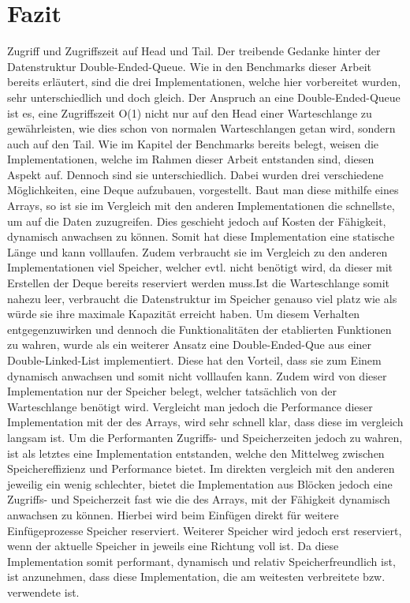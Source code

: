 \documentclass{TUBAFarbeiten}
\begin{document}
\section{Fazit}
Zugriff und Zugriffszeit auf Head und Tail. Der treibende Gedanke hinter der Datenstruktur Double-Ended-Queue. Wie in den Benchmarks dieser Arbeit bereits erläutert, sind die drei Implementationen, welche hier vorbereitet wurden, sehr unterschiedlich und doch gleich. Der Anspruch an eine Double-Ended-Queue ist es, eine Zugriffszeit O(1) nicht nur auf den Head einer Warteschlange zu gewährleisten, wie dies schon von normalen Warteschlangen getan wird, sondern auch auf den Tail. Wie im Kapitel der Benchmarks bereits belegt, weisen die Implementationen, welche im Rahmen dieser Arbeit entstanden sind, diesen Aspekt auf. Dennoch sind sie unterschiedlich. Dabei wurden drei verschiedene Möglichkeiten, eine Deque aufzubauen, vorgestellt. Baut man diese mithilfe eines Arrays, so ist sie im Vergleich mit den anderen Implementationen die schnellste, um auf die Daten zuzugreifen. Dies geschieht jedoch auf Kosten der Fähigkeit, dynamisch anwachsen zu können. Somit hat diese Implementation eine statische Länge und kann volllaufen. Zudem verbraucht sie im Vergleich zu den anderen Implementationen viel Speicher, welcher evtl. nicht benötigt wird, da dieser mit Erstellen der Deque bereits reserviert werden muss.Ist die Warteschlange somit nahezu leer, verbraucht die Datenstruktur im Speicher genauso viel platz wie als würde sie ihre maximale Kapazität erreicht haben. Um diesem Verhalten entgegenzuwirken und dennoch die Funktionalitäten der etablierten Funktionen zu wahren, wurde als ein weiterer Ansatz eine Double-Ended-Que aus einer Double-Linked-List implementiert. Diese hat den Vorteil, dass sie zum Einem dynamisch anwachsen und somit nicht volllaufen kann. Zudem wird von dieser Implementation nur der Speicher belegt, welcher tatsächlich von der Warteschlange benötigt wird. Vergleicht man jedoch die Performance dieser Implementation mit der des Arrays, wird sehr schnell klar, dass diese im vergleich langsam ist. Um die Performanten Zugriffs- und Speicherzeiten jedoch zu wahren, ist als letztes eine Implementation entstanden, welche den Mittelweg zwischen Speichereffizienz und Performance bietet. Im direkten vergleich mit den anderen jeweilig ein wenig schlechter, bietet die Implementation aus Blöcken jedoch eine Zugriffs- und Speicherzeit fast wie die des Arrays, mit der Fähigkeit dynamisch anwachsen zu können. Hierbei wird beim Einfügen direkt für weitere Einfügeprozesse Speicher reserviert. Weiterer Speicher wird jedoch erst reserviert, wenn der aktuelle Speicher in jeweils eine Richtung voll ist. Da diese Implementation somit performant, dynamisch und relativ Speicherfreundlich ist, ist anzunehmen, dass diese Implementation, die am weitesten verbreitete bzw. verwendete ist. 
\newpage
\end{document}

